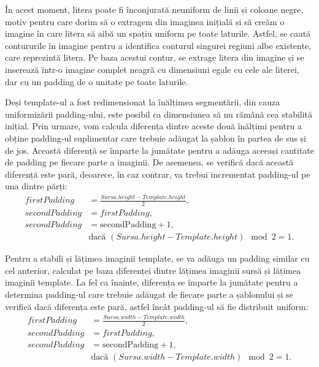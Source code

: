 \documentclass[a4paper,12pt]{report}
\begin{document}
În acest moment, litera poate fi înconjurată neuniform de linii și coloane negre, motiv pentru care dorim să o extragem din imaginea inițială și să creăm o imagine în care litera să aibă un spațiu uniform pe toate laturile. Astfel, se caută contururile în imagine pentru a identifica conturul singurei regiuni albe existente, care reprezintă litera. Pe baza acestui contur, se extrage litera din imagine și se inserează într-o imagine complet neagră cu dimensiuni egale cu cele ale literei, dar cu un padding de o unitate pe toate laturile.

Deși template-ul a fost redimensionat la înălțimea segmentării, din cauza uniformizării padding-ului, este posibil ca dimensiunea să nu rămână cea stabilită inițial. Prin urmare, vom calcula diferența dintre aceste două înălțimi pentru a obține padding-ul suplimentar care trebuie adăugat la șablon în partea de sus și de jos. Această diferență se împarte la jumătate pentru a adăuga aceeași cantitate de padding pe fiecare parte a imaginii. De asemenea, se verifică dacă această diferență este pară, deoarece, în caz contrar, va trebui incrementat padding-ul pe una dintre părți:
\[
    \begin{aligned}
        firstPadding  & = \frac{Sursa.height - Template.height}{2},               \\
        secondPadding & = firstPadding,                                           \\
        secondPadding & = \text{secondPadding} + 1,                               \\
                      & \text{dacă } (Sursa.height - Template.height) \mod 2 = 1.
    \end{aligned}
\]

Pentru a stabili și lățimea imaginii template, se va adăuga un padding similar cu cel anterior, calculat pe baza diferenței dintre lățimea imaginii sursă și lățimea imaginii template. La fel ca înainte, diferența se împarte la jumătate pentru a determina padding-ul care trebuie adăugat de fiecare parte a șablonului și se verifică dacă diferența este pară, astfel încât padding-ul să fie distribuit uniform:
\[
    \begin{aligned}
        firstPadding  & = \frac{Sursa.width - Template.width}{2},               \\
        secondPadding & = firstPadding,                                         \\
        secondPadding & = \text{secondPadding} + 1,                             \\
                      & \text{dacă } (Sursa.width - Template.width) \mod 2 = 1.
    \end{aligned}
\]
\end{document}
